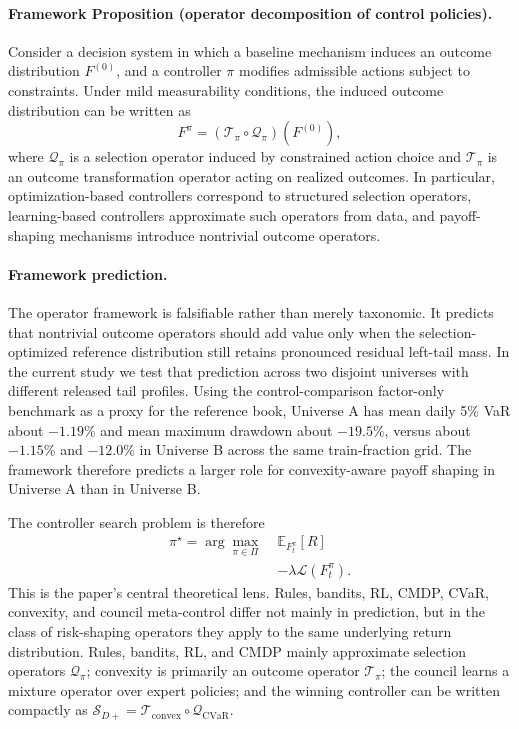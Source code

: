 \documentclass[10pt,twocolumn]{article}
\begin{document}
\paragraph{Framework Proposition (operator decomposition of control policies).}
Consider a decision system in which a baseline mechanism induces an outcome
distribution $F^{(0)}$, and a controller $\pi$ modifies admissible actions
subject to constraints. Under mild measurability conditions, the induced
outcome distribution can be written as
\[
F^\pi = (\mathcal{T}_\pi \circ \mathcal{Q}_\pi)(F^{(0)}),
\]
where $\mathcal{Q}_\pi$ is a selection operator induced by constrained action
choice and $\mathcal{T}_\pi$ is an outcome transformation operator acting on
realized outcomes. In particular, optimization-based controllers correspond to
structured selection operators, learning-based controllers approximate such
operators from data, and payoff-shaping mechanisms introduce nontrivial
outcome operators.

\paragraph{Framework prediction.}
The operator framework is falsifiable rather than merely taxonomic. It predicts
that nontrivial outcome operators should add value only when the
selection-optimized reference distribution still retains pronounced residual
left-tail mass. In the current study we test that prediction across two
disjoint universes with different released tail profiles. Using the
control-comparison factor-only benchmark as a proxy for the reference book,
Universe A has mean daily 5\% VaR about $-1.19\%$ and mean maximum drawdown
about $-19.5\%$, versus about $-1.15\%$ and $-12.0\%$ in Universe B across the
same train-fraction grid. The framework therefore predicts a larger role for
convexity-aware payoff shaping in Universe A than in Universe B.

The controller search problem is therefore
\[
\begin{aligned}
\pi^\star
= \arg\max_{\pi \in \Pi}\;& \mathbb{E}_{F_t^\pi}[R] \\
&- \lambda \mathcal{L}(F_t^\pi).
\end{aligned}
\]
This is the paper's central theoretical lens. Rules, bandits, RL, CMDP, CVaR,
convexity, and council meta-control differ not mainly in prediction, but in the
class of risk-shaping operators they apply to the same underlying return
distribution. Rules, bandits, RL, and CMDP mainly approximate selection
operators $\mathcal{Q}_\pi$; convexity is primarily an outcome operator
$\mathcal{T}_\pi$; the council learns a mixture operator over expert policies;
and the winning controller can be written compactly as
$\mathcal{S}_{D+}=\mathcal{T}_{\text{convex}}\circ\mathcal{Q}_{\text{CVaR}}$.
\end{document}
